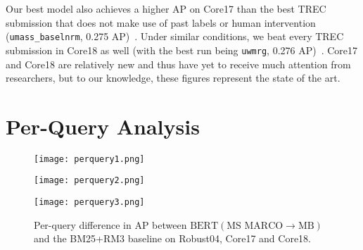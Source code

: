 Our best model also achieves a higher AP on Core17 than the best TREC submission that does not make use of past labels or human intervention (\texttt{umass\_baselnrm}, 0.275 AP)~\cite{allan2017trec}.
Under similar conditions, we beat every TREC submission in Core18 as well (with the best run being \texttt{uwmrg}, 0.276 AP)~\cite{core2018trec}.
Core17 and Core18 are relatively new and thus have yet to receive much attention from researchers, but to our knowledge, these figures represent the state of the art.

\section{Per-Query Analysis}

\begin{figure}[t!]
	\centering
    \begin{minipage}{0.3\textwidth}
        \centering
        \texttt{[image: perquery1.png]}
    \end{minipage}\hfill
    \begin{minipage}{0.3\textwidth}
        \centering
        \texttt{[image: perquery2.png]}
    \end{minipage}\hfill
    \begin{minipage}{0.3\textwidth}
        \centering
        \texttt{[image: perquery3.png]}
    \end{minipage}
\caption{Per-query difference in AP between $ \textrm{BERT}(\textrm{MS MARCO}\rightarrow\textrm{MB}) $ and the BM25+RM3 baseline on Robust04, Core17 and Core18.}
\label{fig:perquery-msmarcomb}
\end{figure}


